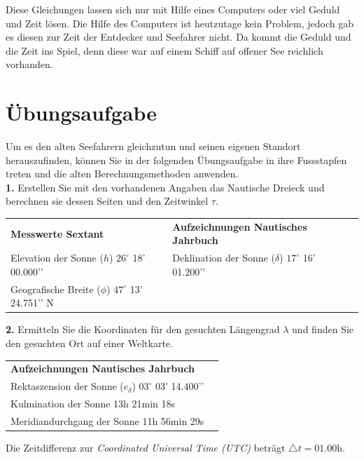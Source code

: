 \begin{refsection}
Diese Gleichungen lassen sich nur mit Hilfe eines Computers oder viel Geduld und Zeit lösen. Die Hilfe des Computers ist heutzutage kein Problem, jedoch gab es diesen zur Zeit der Entdecker und Seefahrer nicht. Da kommt die Geduld und die Zeit ins Spiel, denn diese war auf einem Schiff auf offener See reichlich vorhanden.


\section{Übungsaufgabe}
Um es den alten Seefahrern gleichzutun und seinen eigenen Standort herauszufinden, können Sie in der folgenden Übungsaufgabe in ihre Fussstapfen treten und die alten Berechnungsmethoden anwenden. \\

\textbf{1.} Erstellen Sie mit den vorhandenen Angaben das Nautische Dreieck und berechnen sie dessen Seiten und den Zeitwinkel $\tau$.

\begin{center}
\renewcommand{\arraystretch}{1.5}
\begin{tabular}{llll}
\textbf{Messwerte Sextant} & \textbf{Aufzeichnungen Nautisches Jahrbuch} \\
Elevation der Sonne ($h$) $26^{\circ}$ 18’ 00.000’’ & Deklination der Sonne ($\delta$)  $17^{\circ}$ 16’ 01.200’’ \\
Geografische Breite ($\phi$) $47^{\circ}$ 13’ 24.751’’ N
\end{tabular}
\end{center}


\textbf{2.} Ermitteln Sie die Koordinaten für den gesuchten Längengrad $\lambda$ und finden Sie den gesuchten Ort auf einer Weltkarte.

\begin{center}
\renewcommand{\arraystretch}{1.5}
\begin{tabular}{ll}
\textbf{Aufzeichnungen Nautisches Jahrbuch} \\
Rektaszension der Sonne ($e_\delta$) $03^{\circ}$ 03’ 14.400’’ \\
Kulmination der Sonne 13h 21min 18s \\
Meridiandurchgang der Sonne 11h 56min 29s
\end{tabular}
\end{center}

Die Zeitdifferenz zur \textit{Coordinated Universal Time (UTC)} beträgt $\triangle{t}=01.00$h. \\


\end{refsection}
